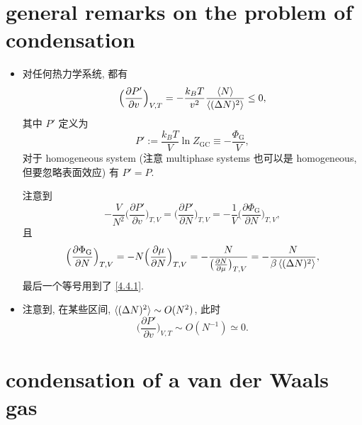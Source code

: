 \section{general remarks on the problem of condensation}
\begin{itemize}
	\item 对任何热力学系统, 都有
	\begin{equation}
		\Big( \frac{\partial P'}{\partial v} \Big)_{V, T} = - \frac{k_B T}{v^2} \frac{\braket{N}}{\braket{(\Delta N)^2}} \leq 0,
	\end{equation}
	其中 $P'$ 定义为
	\begin{equation}
		P' := \frac{k_B T}{V} \ln Z_\text{GC} \equiv - \frac{\Phi_\text{G}}{V},
	\end{equation}
	对于 homogeneous system (注意 multiphase systems 也可以是 homogeneous, 但要忽略表面效应) 有 $P' = P$.
	
	\begin{tcolorbox}[title=calculation:]
		注意到
		\begin{equation}
			- \frac{V}{N^2} \Big( \frac{\partial P'}{\partial v} \Big)_{T, V} = \Big( \frac{\partial P'}{\partial N} \Big)_{T, V} = - \frac{1}{V} \Big( \frac{\partial \Phi_\text{G}}{\partial N} \Big)_{T, V},
		\end{equation}
		且
		\begin{equation}
			\Big( \frac{\partial \Phi_\text{G}}{\partial N} \Big)_{T, V} = - N \Big( \frac{\partial \mu}{\partial N} \Big)_{T, V} = - \frac{N}{\big( \frac{\partial N}{\partial \mu} \big)_{T, V}} = - \frac{N}{\beta \braket{(\Delta N)^2}},
		\end{equation}
		最后一个等号用到了 \eqref{4.4.1}.
	\end{tcolorbox}
	
	\item 注意到, 在某些区间, $\braket{(\Delta N)^2} \sim O(N^2)$, 此时
	\begin{equation}
		\Big( \frac{\partial P'}{\partial v} \Big)_{V, T} \sim O(N^{- 1}) \simeq 0.
	\end{equation}
\end{itemize}

\section{condensation of a van der Waals gas}
